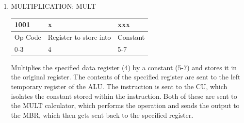 \documentclass{mcgillhomework}
\begin{document}
\begin{enumerate}
		\item MULTIPLICATION: MULT\\
		\begin{tabularx}{\textwidth}{|X|X|X|}
			\hline 1001 & x & xxx
			\\ \hline Op-Code & Register to store into & Constant
			\\ \hline 0-3 & 4 & 5-7
			\\ \hline
		\end{tabularx}
		Multiplies the specified data register (4) by a constant (5-7) and stores it in the original register. The contents of the specified register are sent to the left temporary register of the ALU. The instruction is sent to the CU, which isolates the constant stored within the instruction. Both of these are sent to the MULT calculator, which performs the operation and sends the output to the MBR, which then gets sent back to the specified register.
		
	\end{enumerate}
\end{document}
